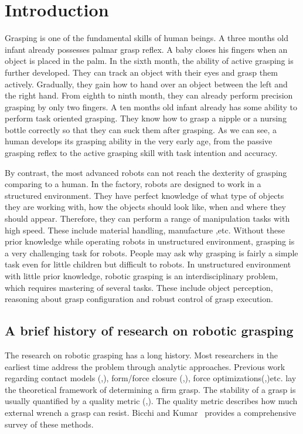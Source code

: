 
\chapter{Introduction}
Grasping is one of the fundamental skills of human beings.  A three months old infant already possesses palmar grasp reflex. A baby closes his fingers when an object is placed in the palm. In the sixth month, the ability of active grasping is further developed. They can track an object with their eyes and grasp them actively. Gradually, they gain how to hand over an object between the left and the right hand. From eighth to ninth month, they can already perform precision grasping by only two fingers.  A ten months old infant already has some ability to perform task oriented grasping. They know how to grasp a nipple or a nursing bottle correctly so that they can suck them after grasping. As we can see, a human develops its grasping ability in the very early age, from the passive grasping reflex to the active grasping skill with task intention and accuracy. 

By contrast, the most advanced robots  can not reach the dexterity of grasping comparing to a human. In the factory, robots are designed to work in a structured environment. They have perfect knowledge of what type of objects they are working with, how the objects should look like,  when and where they should appear. Therefore, they can perform a range of manipulation tasks with high speed. These include material handling, manufacture ,etc.  Without these prior knowledge while operating robots in unstructured environment, grasping is a very challenging task for robots. People may ask why grasping is fairly a simple task even for little children but difficult to robots. In unstructured environment with little prior knowledge, robotic grasping is an interdisciplinary problem, which requires mastering of several tasks. These include object perception, reasoning about grasp configuration and robust control of grasp execution. 

\section{A brief history of research on robotic grasping}
The research on robotic grasping has a long history. Most researchers in the earliest time address the problem through analytic approaches. Previous work regarding contact models (\cite{Salisbury1983},\cite{Sinha1992}),  form/force closure (\cite{Dizioglu1984},\cite{Nguyen1988}), force optimizations(\cite{Buss1996},\cite{Liu2004})etc. lay the theoretical framework of determining a firm grasp. The stability of a grasp is usually quantified by a  quality metric (\cite{roa2015grasp},\cite{Borst2004}). The quality metric describes how much external wrench a grasp can resist. Bicchi and Kumar~\cite{Bicchi2000} provides a comprehensive survey of these methods. 

